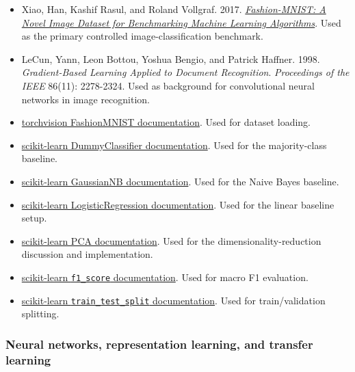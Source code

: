 \documentclass[11pt]{article}
\providecommand{\tightlist}{%
      \setlength{\itemsep}{0pt}\setlength{\parskip}{0pt}}
\begin{document}
\begin{itemize}
\tightlist
\item
  Xiao, Han, Kashif Rasul, and Roland Vollgraf. 2017.
  \href{https://arxiv.org/abs/1708.07747}{\emph{Fashion-MNIST: A Novel
  Image Dataset for Benchmarking Machine Learning Algorithms}}. Used as
  the primary controlled image-classification benchmark.
\item
  LeCun, Yann, Leon Bottou, Yoshua Bengio, and Patrick Haffner. 1998.
  \emph{Gradient-Based Learning Applied to Document Recognition}.
  \emph{Proceedings of the IEEE} 86(11): 2278-2324. Used as background
  for convolutional neural networks in image recognition.
\item
  \href{https://pytorch.org/vision/stable/generated/torchvision.datasets.FashionMNIST.html}{torchvision
  FashionMNIST documentation}. Used for dataset loading.
\item
  \href{https://scikit-learn.org/stable/modules/generated/sklearn.dummy.DummyClassifier.html}{scikit-learn
  DummyClassifier documentation}. Used for the majority-class baseline.
\item
  \href{https://scikit-learn.org/stable/modules/generated/sklearn.naive_bayes.GaussianNB.html}{scikit-learn
  GaussianNB documentation}. Used for the Naive Bayes baseline.
\item
  \href{https://scikit-learn.org/stable/modules/generated/sklearn.linear_model.LogisticRegression.html}{scikit-learn
  LogisticRegression documentation}. Used for the linear baseline setup.
\item
  \href{https://scikit-learn.org/stable/modules/generated/sklearn.decomposition.PCA.html}{scikit-learn
  PCA documentation}. Used for the dimensionality-reduction discussion
  and implementation.
\item
  \href{https://scikit-learn.org/stable/modules/generated/sklearn.metrics.f1_score.html}{scikit-learn
  \texttt{f1\_score} documentation}. Used for macro F1 evaluation.
\item
  \href{https://scikit-learn.org/stable/modules/generated/sklearn.model_selection.train_test_split.html}{scikit-learn
  \texttt{train\_test\_split} documentation}. Used for train/validation
  splitting.
\end{itemize}

\subsubsection{Neural networks, representation learning, and transfer
learning}\label{neural-networks-representation-learning-and-transfer-learning}
\end{document}
